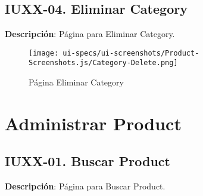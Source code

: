 \clearpage
\subsection{IUXX-04. Eliminar Category} \label{sec:ui-page-delete-category}

\textbf{Descripci\'on}: P\'agina para Eliminar Category.\\

\begin{figure}[H]
	\label{tab:ui-delete-category-page}
	\texttt{[image: ui-specs/ui-screenshots/Product-Screenshots.js/Category-Delete.png]}
	\caption{P\'agina Eliminar Category}
\end{figure}

\begin{table}[H]
	\caption{Forma Eliminar Category}
	\label{tab:ui-delete-category-form}
\end{table}



\section{Administrar Product} \label{sec:cf-ui-admin-product}

\subsection{IUXX-01. Buscar Product} \label{sec:ui-page-search-product}

\textbf{Descripci\'on}: P\'agina para Buscar Product.\\

